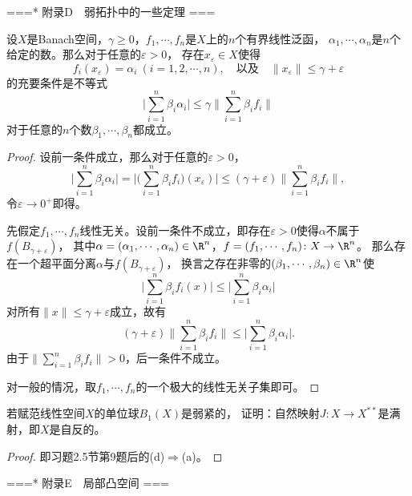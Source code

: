 ===* 附录D\ \ 弱拓扑中的一些定理 ===
\begin{1}
    设$X$是Banach空间，$\gamma\geqslant0$，$f_1,\cdots,f_n$是$X$上的$n$个有界线性泛函，
    $\alpha_1,\cdots,\alpha_n$是$n$个给定的数。那么对于任意的$\varepsilon>0$，
    存在$x_\varepsilon \in X$使得
    $$f_i(x_\varepsilon)=\alpha_i\ (i=1,2,\cdots,n),
    \quad\text{以及}\quad\|x_\varepsilon\|\leqslant\gamma+\varepsilon$$
    的充要条件是不等式
    $$\bigg|\sum_{i=1}^n\beta_i\alpha_i\bigg|
    \leqslant\gamma\bigg\|\sum_{i=1}^n\beta_if_i\bigg\|$$
    对于任意的$n$个数$\beta_1,\cdots,\beta_n$都成立。
\end{1}
\begin{proof}
    设前一条件成立，那么对于任意的$\varepsilon>0$，
    $$\bigg|\sum_{i=1}^n\beta_i\alpha_i\bigg|
    =\bigg|\bigg(\sum_{i=1}^n\beta_if_i\bigg)(x_\varepsilon)\bigg|
    \leqslant(\gamma+\varepsilon)\bigg\|\sum_{i=1}^n\beta_if_i\bigg\|,$$
    令$\varepsilon\to0^+$即得。

    先假定$f_1,\cdots,f_n$线性无关。设前一条件不成立，即存在$\varepsilon>0$使得$\alpha$不属于$f(B_{\gamma+\varepsilon})$，
    其中$\alpha=(\alpha_1,\cdots,\alpha_n)\in\R^n$，$f=(f_1,\cdots,f_n)\colon X\to\R^n$。
    那么存在一个超平面分离$\alpha$与$f(B_{\gamma+\varepsilon})$，
    换言之存在非零的$(\beta_1,\cdots,\beta_n)\in\R^n$使
    $$\bigg|\sum_{i=1}^n\beta_if_i(x)\bigg|
    \leqslant \bigg|\sum_{i=1}^n\beta_i\alpha_i\bigg|$$
    对所有$\|x\|\leqslant\gamma+\varepsilon$成立，故有
    $$(\gamma+\varepsilon)\bigg\|\sum_{i=1}^n\beta_if_i\bigg\|
    \leqslant \bigg|\sum_{i=1}^n\beta_i\alpha_i\bigg|.$$
    由于$\Big\|\sum\limits_{i=1}^n\beta_if_i\Big\|>0$，后一条件不成立。

    对一般的情况，取$f_1,\cdots,f_n$的一个极大的线性无关子集即可。
\end{proof}

\begin{3}
    若赋范线性空间$X$的单位球$B_1(X)$是弱紧的，
    证明：自然映射$J:X\to X^{**}$是满射，即$X$是自反的。
\end{3}
\begin{proof}
    即习题2.5节第9题后的(d)$\Rightarrow$(a)。
\end{proof}

===* 附录E\ \ 局部凸空间 ===

